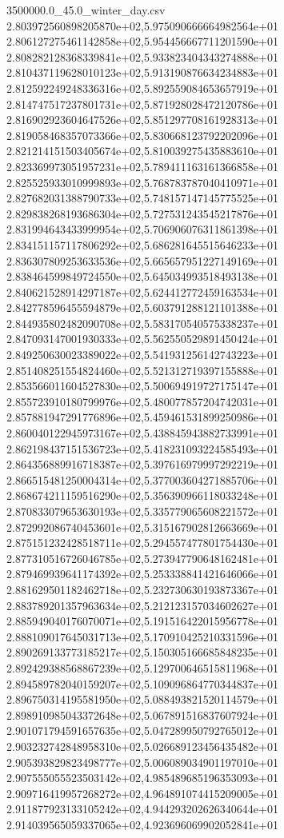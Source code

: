 \begin{filecontents*}{3500000.0_45.0_winter_day.csv}
2.803972560898205870e+02,5.975090666664982564e+01
2.806127275461142858e+02,5.954456667711201590e+01
2.808282128368339841e+02,5.933823404343274888e+01
2.810437119628010123e+02,5.913190876634234883e+01
2.812592249248336316e+02,5.892559084653657919e+01
2.814747517237801731e+02,5.871928028472120786e+01
2.816902923604647526e+02,5.851297708161928313e+01
2.819058468357073366e+02,5.830668123792202096e+01
2.821214151503405674e+02,5.810039275435883610e+01
2.823369973051957231e+02,5.789411163161366858e+01
2.825525933010999893e+02,5.768783787040410971e+01
2.827682031388790733e+02,5.748157147145775525e+01
2.829838268193686304e+02,5.727531243545217876e+01
2.831994643433999954e+02,5.706906076311861398e+01
2.834151157117806292e+02,5.686281645515646233e+01
2.836307809253633536e+02,5.665657951227149169e+01
2.838464599849724550e+02,5.645034993518493138e+01
2.840621528914297187e+02,5.624412772459163534e+01
2.842778596455594879e+02,5.603791288121101388e+01
2.844935802482090708e+02,5.583170540575338237e+01
2.847093147001930333e+02,5.562550529891450424e+01
2.849250630023389022e+02,5.541931256142743223e+01
2.851408251554824460e+02,5.521312719397155888e+01
2.853566011604527830e+02,5.500694919727175147e+01
2.855723910180799976e+02,5.480077857204742031e+01
2.857881947291776896e+02,5.459461531899250986e+01
2.860040122945973167e+02,5.438845943882733991e+01
2.862198437151536723e+02,5.418231093224585493e+01
2.864356889916718387e+02,5.397616979997292219e+01
2.866515481250004314e+02,5.377003604271885706e+01
2.868674211159516290e+02,5.356390966118033248e+01
2.870833079653630193e+02,5.335779065608221572e+01
2.872992086740453601e+02,5.315167902812663669e+01
2.875151232428518711e+02,5.294557477801754430e+01
2.877310516726046785e+02,5.273947790648162481e+01
2.879469939641174392e+02,5.253338841421646066e+01
2.881629501182462718e+02,5.232730630193873367e+01
2.883789201357963634e+02,5.212123157034602627e+01
2.885949040176070071e+02,5.191516422015956778e+01
2.888109017645031713e+02,5.170910425210331596e+01
2.890269133773185217e+02,5.150305166685848235e+01
2.892429388568867239e+02,5.129700646515811968e+01
2.894589782040159207e+02,5.109096864770344837e+01
2.896750314195581950e+02,5.088493821520114579e+01
2.898910985043372648e+02,5.067891516837607924e+01
2.901071794591657635e+02,5.047289950792765012e+01
2.903232742848958310e+02,5.026689123456435482e+01
2.905393829823498777e+02,5.006089034901197010e+01
2.907555055523503142e+02,4.985489685196353093e+01
2.909716419957268272e+02,4.964891074415209005e+01
2.911877923133105242e+02,4.944293202626340644e+01
2.914039565059337065e+02,4.923696069902052841e+01

\end{filecontents*}

